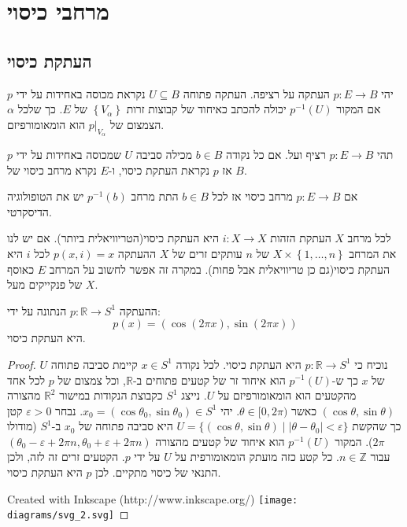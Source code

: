 \documentclass{tstextbook}
\begin{document}
  \chapter{מרחבי כיסוי}

\section{העתקת כיסוי}

\begin{definition}
יהי \(p:E\to B\) העתקה על רציפה. העתקה פתוחה \(U\subseteq B\) נקראת מכוסה באחידות על ידי \(p\) אם המקור \(p ^{-1}(U)\) יכולה להכתב כאיחוד של קבוצות זרות \(\left\{  V_{\alpha}  \right\}\) של \(E\). כך שלכל \(\alpha\) הצמצום של \(p|_{V_{\alpha}}\) הוא הומאומורפיזם.

\end{definition}
\begin{definition}
תהי \(p:E\to B\) רציף ועל. אם כל נקודה \(b \in B\) מכילה סביבה \(U\) שמכוסה באחידות על ידי \(p\) אז \(p\) נקראת העתקת כיסוי, ו-\(E\) נקרא מרחב כיסוי של \(B\).

\end{definition}
\begin{remark}
אם \(p:E\to B\) מרחב כיסוי אז לכל \(b \in B\) התת מרחב \(p ^{-1}(b)\) יש את הטופולוגיה הדיסקרטי.

\end{remark}
\begin{example}
לכל מרחב \(X\) העתקת הזהות \(i:X\to X\) היא העתקת כיסוי(הטריוויאלית ביותר). אם יש לנו את המרחב \(X\times \left\{  1,\dots,n \right\}\) של \(n\) עותקים זרים של \(X\) ההעתקה \(p(x,i)=x\) לכל \(i\) היא העתקת כיסוי(גם כן טריוויאלית אבל פחות). במקרה זה אפשר לחשוב על המרחב \(E\) כאוסף של פנקייקים מעל \(X\).

\end{example}
\begin{example}
ההעתקה \(p:\mathbb{R}\to S^{1}\) הנתונה על ידי:
$$p(x)=\left( \cos\left( 2\pi x \right),\sin\left( 2\pi x \right) \right)$$
היא העתקת כיסוי.

\end{example}
\begin{proof}
נוכיח כי \(p:\mathbb{R}\to S^{1}\) היא העתקת כיסוי. לכל נקודה \(x\in S^{1}\) קיימת סביבה פתוחה \(U\) של \(x\) כך ש-\(p^{-1}(U)\) הוא איחוד זר של קטעים פתוחים ב-\(\mathbb{R}\), וכל צמצום של \(p\) לכל אחד מהקטעים הוא הומאומורפיזם על \(U\).
נייצג \(S^{1}\) כקבוצת הנקודות במישור \(\mathbb{R}^{2}\) מהצורה \((\cos\theta,\sin\theta)\) כאשר \(\theta\in[0,2\pi)\). יהי \(x_{0}=(\cos\theta_{0},\sin\theta_{0})\in S^{1}\). נבחר \(\varepsilon>0\) קטן כך שהקשת \(U=\{(\cos\theta,\sin\theta)\mid |\theta-\theta_{0}|<\varepsilon\}\) היא סביבה פתוחה של \(x_{0}\) ב-\(S^{1}\) (מודולו \(2\pi\)).
המקור \(p^{-1}(U)\) הוא איחוד של קטעים מהצורה \((\theta_{0}-\varepsilon+2\pi n,\theta_{0}+\varepsilon+2\pi n)\) עבור \(n\in\mathbb{Z}\). כל קטע כזה מועתק הומאומורפית על \(U\) על ידי \(p\). הקטעים זרים זה לזה, ולכן התנאי של כיסוי מתקיים.
לכן \(p\) היא העתקת כיסוי.

 Created with Inkscape (http://www.inkscape.org/) \texttt{[image: diagrams/svg\_2.svg]}
\end{proof}
\end{document}
